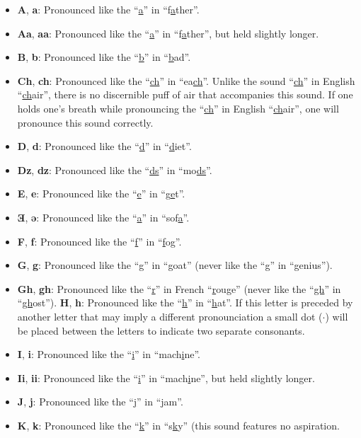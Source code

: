 \begin{itemize}
\item
\textbf{A}, \textbf{a}:
Pronounced like the ``\uline{a}'' in ``f\uline{a}ther''.
\item
\textbf{Aa}, \textbf{aa}:
Pronounced like the ``\uline{a}'' in ``f\uline{a}ther'', but held slightly longer.
\item
\textbf{B}, \textbf{b}:
Pronounced like the ``\uline{b}'' in ``\uline{b}ad''.
\item
\textbf{Ch}, \textbf{ch}:
Pronounced like the ``\uline{ch}'' in ``ea\uline{ch}''.
Unlike the sound ``\uline{ch}'' in English ``\uline{ch}air'', there is no discernible puff of air that accompanies this sound.
If one holds one's breath while pronouncing the ``\uline{ch}'' in English ``\uline{ch}air'', one will pronounce this sound correctly.
\item
\textbf{D}, \textbf{d}:
Pronounced like the ``\uline{d}'' in ``\uline{d}iet''.
\item
\textbf{Dz}, \textbf{dz}:
Pronounced like the ``\uline{ds}'' in ``mo\uline{ds}''.
\item
\textbf{E}, \textbf{e}:
Pronounced like the ``\uline{e}'' in ``g\uline{e}t''.
\item
\textbf{Ǝ}, \textbf{ǝ}:
Pronounced like the ``\uline{a}'' in ``sof\uline{a}''.
\item
\textbf{F}, \textbf{f}:
Pronounced like the ``\uline{f}'' in ``\uline{f}og''.
\item
\textbf{G}, \textbf{g}:
Pronounced like the ``\uline{g}'' in ``\uline{g}oat'' (never like the ``\uline{g}'' in ``\uline{g}enius'').
\item
\textbf{Gh}, \textbf{gh}:
Pronounced like the ``\uline{r}'' in French ``\uline{r}ouge'' (never like the ``\uline{gh}'' in ``\uline{gh}ost'').
\textbf{H}, \textbf{h}:
Pronounced like the ``\uline{h}'' in ``\uline{h}at''.
If this letter is preceded by another letter that may imply a different pronounciation a small dot ($\cdot$) will be placed between the letters to indicate two separate consonants.
\item
\textbf{I}, \textbf{i}:
Pronounced like the ``\uline{i}'' in ``mach\uline{i}ne''.
\item
\textbf{Ii}, \textbf{ii}:
Pronounced like the ``\uline{i}'' in ``mach\uline{i}ne'', but held slightly longer.
\item
\textbf{J}, \textbf{j}:
Pronounced like the ``\uline{j}'' in ``\uline{j}am''.
\item
\textbf{K}, \textbf{k}:
Pronounced like the ``\uline{k}'' in ``s\uline{k}y'' (this sound features no aspiration.

\end{itemize}
